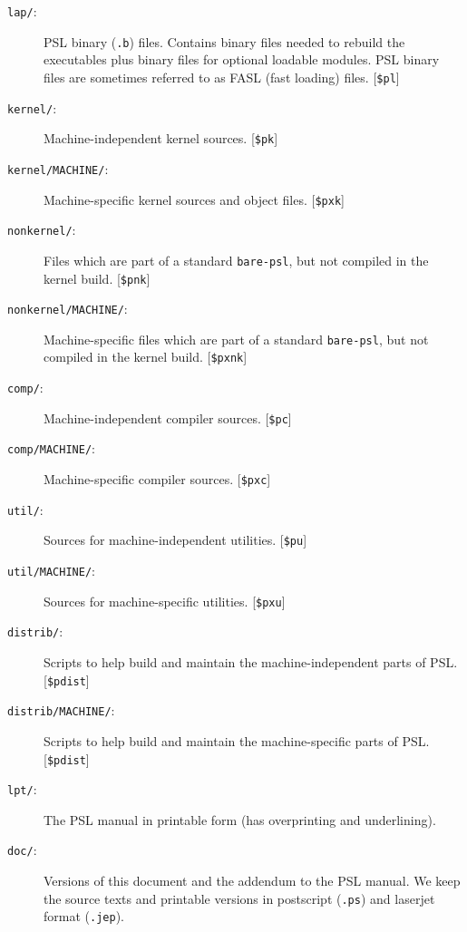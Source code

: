 \begin{description}

\item[{\tt lap/}:]
PSL binary ({\tt *.b}) files.  Contains binary files needed to
rebuild the executables plus binary files for optional loadable
modules.  PSL binary files are sometimes referred to as FASL (fast
loading) files.  [{\tt \$pl}]

\item[{\tt kernel/}:]
Machine-independent kernel sources. [{\tt \$pk}]

\item[{\tt kernel/MACHINE/}:]
Machine-specific kernel sources and object files. [{\tt \$pxk}]

\item[{\tt nonkernel/}:]
Files which are part of a standard {\tt bare-psl}, but not
compiled in the kernel build. [{\tt \$pnk}]

\item[{\tt nonkernel/MACHINE/}:]
Machine-specific files which are part of a standard {\tt bare-psl}, but
not compiled in the kernel build. [{\tt \$pxnk}]

\item[{\tt comp/}:]
Machine-independent compiler sources. [{\tt \$pc}]

\item[{\tt comp/MACHINE/}:]
Machine-specific compiler sources. [{\tt \$pxc}]

\item[{\tt util/}:]
Sources for machine-independent utilities. [{\tt \$pu}]

\item[{\tt util/MACHINE/}:]
Sources for machine-specific utilities. [{\tt \$pxu}]

\item[{\tt distrib/}:]
Scripts to help build and maintain the machine-independent parts of
PSL. [{\tt \$pdist}]

\item[{\tt distrib/MACHINE/}:]
Scripts to help build and maintain the machine-specific parts of PSL.
[{\tt \$pdist}]

\item[{\tt lpt/}:]
The PSL manual in printable form (has overprinting and underlining).

\item[{\tt doc/}:]
Versions of this document and the addendum to the PSL manual.  We keep
the source texts and printable versions in postscript ({\tt .ps}) and
laserjet format ({\tt .jep}).

\end{description}

